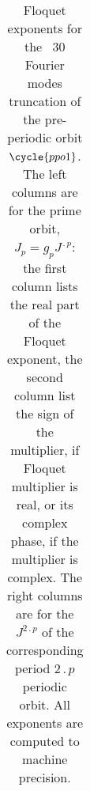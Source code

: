 \begin{table}
\begin{tabular}{c | c   c | c  c |}
		\end{tabular}
		\caption{\label{tab:FloqExpPPO1}
        Floquet exponents for the \KS\ 30 Fourier modes truncation of the
        pre-periodic orbit $\cycle{ppo1}$. The left columns are for the
        prime orbit, {\jacobianM} $J_{p}=g_{p}J^{\period{p}}$: the first
        column lists the real part of the Floquet exponent, the second
        column list the sign of the multiplier, if Floquet multiplier is
        real, or its complex phase, if the multiplier is complex. The
        right columns are for the {\jacobianM} $J^{2\period{p}}$ of the
        corresponding period $2\period{p}$
        periodic orbit. All exponents are computed to machine precision.
        }
		\end{table}
